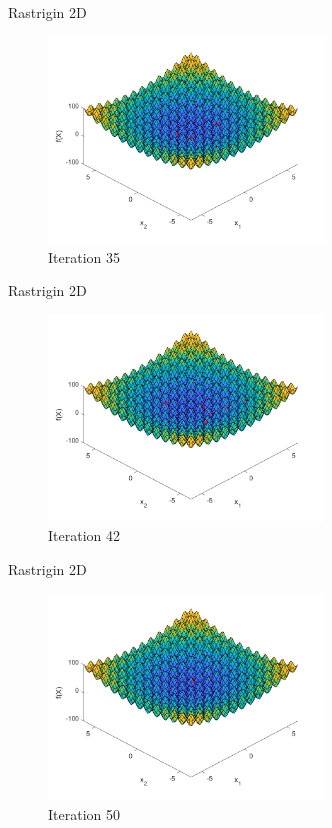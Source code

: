 \documentclass[xcolor=table]{beamer}
\begin{document}
\begin{frame}{Rastrigin 2D}
  \begin{figure}[h]
  \begin{center}
    \includegraphics[width=0.65\textwidth]{img/smpl/rast2d/loa-iter-35}
    \caption{Iteration 35}
  \end{center}
  \end{figure}
\end{frame}
\begin{frame}{Rastrigin 2D}
  \begin{figure}[h]
  \begin{center}
    \includegraphics[width=0.65\textwidth]{img/smpl/rast2d/loa-iter-42}
    \caption{Iteration 42}
  \end{center}
  \end{figure}
\end{frame}
\begin{frame}{Rastrigin 2D}
  \begin{figure}[h]
  \begin{center}
    \includegraphics[width=0.65\textwidth]{img/smpl/rast2d/loa-iter-50}
    \caption{Iteration 50}
  \end{center}
  \end{figure}
\end{frame}
\end{document}
